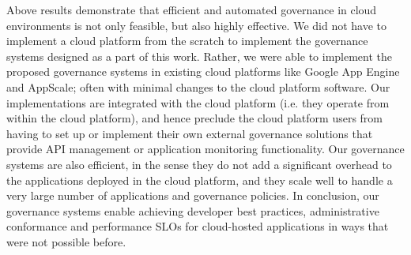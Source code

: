 Above results demonstrate that efficient and automated governance in cloud environments
is not only feasible, but also highly effective. We did not have to implement a cloud platform from the 
scratch to implement the governance systems designed as a part of this work. Rather,
we were able to implement the proposed governance systems in existing cloud platforms
like Google App Engine and AppScale; often with minimal changes to the cloud platform
software. Our implementations are integrated with the cloud platform (i.e. they operate from
within the cloud platform), and hence preclude 
the cloud platform users from having to set up or
implement their own external governance solutions that provide API management or
application monitoring functionality. Our governance systems are also efficient, in the 
sense they do not add a significant overhead to the applications deployed in the cloud
platform, and they scale well to handle a very large number of applications and governance
policies. In conclusion, our governance systems enable achieving developer best practices, 
administrative conformance and performance SLOs for cloud-hosted applications in ways
that were not possible before.